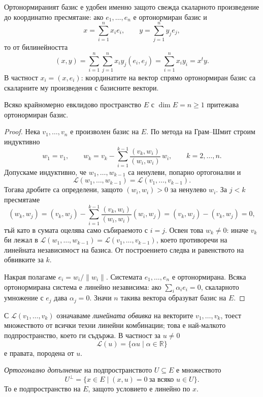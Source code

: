 Ортонормираният базис е удобен именно защото свежда скаларното произведение до координатно пресмятане: ако $e_1,\ldots,e_n$ е ортонормиран базис и
\[
x=\sum_{i=1}^n x_ie_i,
\qquad
y=\sum_{j=1}^n y_je_j,
\]
то от билинейността
\[
(x,y)=\sum_{i=1}^n\sum_{j=1}^n x_iy_j(e_i,e_j)=\sum_{i=1}^n x_iy_i=x^ty .
\]
В частност $x_i=(x,e_i)$: координатите на вектор спрямо ортонормиран базис са скаларните му произведения с базисните вектори.

\begin{prop}
Всяко крайномерно евклидово пространство $E$ с $\dim E=n\geq1$ притежава ортонормиран базис.
\end{prop}

\begin{proof}
Нека $v_1,\ldots,v_n$ е произволен базис на $E$. По метода на Грам--Шмит строим индуктивно
\[
w_1=v_1,
\qquad
w_k=v_k-\sum_{i=1}^{k-1}\frac{(v_k,w_i)}{(w_i,w_i)}\,w_i,
\qquad k=2,\ldots,n.
\]
Допускаме индуктивно, че $w_1,\ldots,w_{k-1}$ са ненулеви, попарно ортогонални и
\[
\mathcal{L}(w_1,\ldots,w_{k-1})=\mathcal{L}(v_1,\ldots,v_{k-1}).
\]
Тогава дробите са определени, защото $(w_i,w_i)>0$ за ненулево $w_i$. За $j<k$ пресмятаме
\[
(w_k,w_j)
=(v_k,w_j)-\sum_{i=1}^{k-1}\frac{(v_k,w_i)}{(w_i,w_i)}(w_i,w_j)
=(v_k,w_j)-(v_k,w_j)=0,
\]
тъй като в сумата оцелява само събираемото с $i=j$. Освен това $w_k\ne0$: иначе $v_k$ би лежал в $\mathcal{L}(w_1,\ldots,w_{k-1})=\mathcal{L}(v_1,\ldots,v_{k-1})$, което противоречи на линейната независимост на базиса. От построението следва и равенството на обвивките за $k$.

Накрая полагаме $e_i=w_i/\|w_i\|$. Системата $e_1,\ldots,e_n$ е ортонормирана. Всяка ортонормирана система е линейно независима: ако $\sum_i\alpha_ie_i=0$, скаларното умножение с $e_j$ дава $\alpha_j=0$. Значи $n$ такива вектора образуват базис на $E$.
\end{proof}

\begin{defn}
С $\mathcal{L}(v_1,\ldots,v_k)$ означаваме \emph{линейната обвивка} на векторите $v_1,\ldots,v_k$, тоест множеството от всички техни линейни комбинации; това е най-малкото подпространство, което ги съдържа. В частност за $u\ne0$
\[
\mathcal{L}(u)=\{\alpha u\mid\alpha\in\mathbb{R}\}
\]
е правата, породена от $u$.

\emph{Ортогонално допълнение} на подпространството $U\subseteq E$ е множеството
\[
U^\perp=\{x\in E\mid (x,u)=0\ \text{за всяко }u\in U\}.
\]
То е подпространство на $E$, защото условието е линейно по $x$.
\end{defn}

